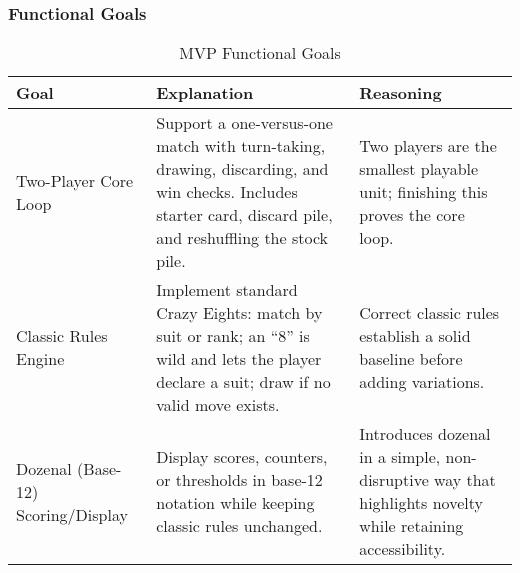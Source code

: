 \documentclass{article}
\begin{document}
    \subsubsection{Functional Goals}
    \begin{table}[H]
        \caption{MVP Functional Goals}\label{TblMVPFunctionalGoals}
        \begin{tabular}{|p{}|p{}|p{}|}
            \hline
            \textbf{Goal} & \textbf{Explanation} & \textbf{Reasoning} \\
            \hline
            Two-Player Core Loop &
            Support a one-versus-one match with turn-taking, drawing, discarding, and win checks. Includes starter card, discard pile, and reshuffling the stock pile. &
            Two players are the smallest playable unit; finishing this proves the core loop. \\
            \hline
            Classic Rules Engine &
            Implement standard Crazy Eights: match by suit or rank; an ``8'' is wild and lets the player declare a suit; draw if no valid move exists. &
            Correct classic rules establish a solid baseline before adding variations. \\
            \hline
            Dozenal (Base-12) Scoring/Display &
            Display scores, counters, or thresholds in base-12 notation while keeping classic rules unchanged. &
            Introduces dozenal in a simple, non-disruptive way that highlights novelty while retaining accessibility. \\
            \hline
        \end{tabular}
    \end{table}
\end{document}
